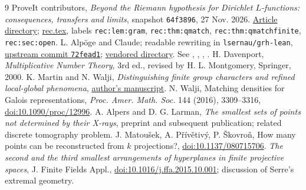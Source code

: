 \documentclass[11pt]{article}
\theoremstyle{remark}\newtheorem{remark}[theorem]{Remark}
\begin{document}
\begin{thebibliography}{9}
\small\setlength{\itemsep}{1pt}\setlength{\parskip}{0pt}
 ProveIt contributors, \emph{Beyond the Riemann hypothesis for Dirichlet $L$-functions: consequences, transfers and limits}, snapshot \texttt{64f3896}, 27 Nov. 2026. \href{https://github.com/VladimirReshetnikov/ProveIt/tree/64f3896557566342bc28ed309513a2b762568866/Analysis/GeneralizedRiemannHypothesis/Article}{Article directory}; \href{https://github.com/VladimirReshetnikov/ProveIt/blob/64f3896557566342bc28ed309513a2b762568866/Analysis/GeneralizedRiemannHypothesis/Article/sections/rec.tex}{rec.tex}, labels \texttt{rec:lem:gram}, \texttt{rec:thm:qmatch}, \texttt{rec:thm:qmatchfinite}, \texttt{rec:sec:open}.
 L. Alp\"oge and Claude; readable rewriting in \texttt{lsernau/grh-lean}, \href{https://github.com/lsernau/grh-lean/tree/72fead102f663d5c7a407964a13dc0cf9d977207/grh}{upstream commit \texttt{72fead1}}; \href{https://github.com/VladimirReshetnikov/ProveIt/tree/64f3896557566342bc28ed309513a2b762568866/Analysis/GeneralizedRiemannHypothesis/vendor/grh-lean}{vendored directory}. See , , , .
 H. Davenport, \emph{Multiplicative Number Theory}, 3rd ed., revised by H. L. Montgomery, Springer, 2000.
 K. Martin and N. Walji, \emph{Distinguishing finite group characters and refined local-global phenomena}, \href{https://kimballmartin.github.io/papers/dist-artin.pdf}{author's manuscript}.
 N. Walji, Matching densities for Galois representations, \emph{Proc. Amer. Math. Soc.} 144 (2016), 3309--3316, \href{https://doi.org/10.1090/proc/12996}{doi:10.1090/proc/12996}.
 A. Alpers and D. G. Larman, \emph{The smallest sets of points not determined by their X-rays}, preprint and subsequent publication; related discrete tomography problem.
 J. Matou\v{s}ek, A. P\v{r}\'{i}v\v{e}tiv\'{y}, P. \v{S}kovro\v{n}, How many points can be reconstructed from $k$ projections?, \href{https://doi.org/10.1137/080715706}{doi:10.1137/080715706}.
 \emph{The second and the third smallest arrangements of hyperplanes in finite projective spaces}, J. Finite Fields Appl., \href{https://doi.org/10.1016/j.ffa.2015.10.001}{doi:10.1016/j.ffa.2015.10.001}; discussion of Serre's extremal geometry.
\end{thebibliography}
\end{document}
